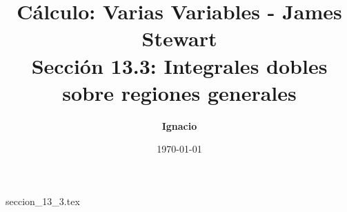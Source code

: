 \documentclass[11pt,spanish,oneside]{report}
\title{\textbf{Cálculo: Varias Variables - James Stewart} \\ \Large Sección 13.3: Integrales dobles sobre regiones generales}
\author{\textbf{Ignacio}}
\date{\today}
\begin{document}
\maketitle

{seccion_13_3.tex}
\end{document}
